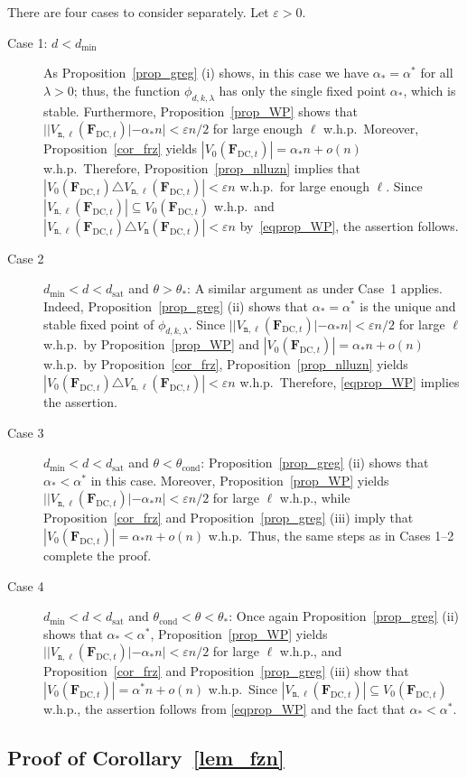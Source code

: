 \documentclass[10pt,reqno]{amsart}
\numberwithin{equation}{section}
\renewcommand{\vec}[1]{\boldsymbol{#1}}
\renewcommand{\subset}{\subseteq}
\newcommand\dmin{d_{\mathrm{min}}}
\newcommand\dsat{d_{\mathrm{sat}}}
\newcommand{\FDC}[1]{\PHI_{\mathrm{DC},{#1}}}
\newcommand{\tcond}{\theta_{\mathrm{cond}}}
\newcommand{\frz}{V_0}
\newcommand{\nll}{\mathtt{n}}
\newcommand\PHI{\vec F}
\newcommand\eps{\varepsilon}
\newcommand{\whp}{w.h.p.}
\newcommand\Prop{Proposition}
\newcommand\Cor{Corollary}
\newcommand{\ph}{\phi_{d,k,\lambda}}
\begin{document}
There are four cases to consider separately.
Let $\eps>0$.
\begin{description}
	\item[Case 1: $d<\dmin$]
		As \Prop~\ref{prop_greg} (i) shows, in this case we have $\alpha_*=\alpha^*$ for all $\lambda>0$; thus, the function $\ph$ has only the single fixed point $\alpha_*$, which is stable.
		Furthermore, \Prop~\ref{prop_WP} shows that $||V_{\nll,\ell}(\FDC t)|-\alpha_*n|<\eps n/2$ for large enough $\ell$ \whp\
		Moreover, \Prop~\ref{cor_frz} yields $|\frz(\FDC t)|=\alpha_*n+o(n)$ \whp\
		Therefore, \Prop~\ref{prop_nlluzn} implies that $|\frz(\FDC t)\triangle V_{\nll,\ell}(\FDC t)|<\eps n$ \whp\ for large enough $\ell$.
		Since $|V_{\nll,\ell}(\FDC t)|\subset\frz(\FDC t)$ \whp\ and $|V_{\nll,\ell}(\FDC t)\triangle V_{\nll}(\FDC t)|<\eps n$ by~\eqref{eqprop_WP}, the assertion follows.
	\item[Case 2] $\dmin<d<\dsat$ and $\theta>\theta_*$: 
		A similar argument as under Case~1 applies.
		Indeed, \Prop~\ref{prop_greg} (ii) shows that $\alpha_*=\alpha^*$ is the unique and stable fixed point of $\ph$.
		Since $||V_{\nll,\ell}(\FDC t)|-\alpha_*n|<\eps n/2$ for large $\ell$ \whp\ by \Prop~\ref{prop_WP} and $|\frz(\FDC t)|=\alpha_*n+o(n)$ \whp\ by \Prop~\ref{cor_frz}, \Prop~\ref{prop_nlluzn} yields $|\frz(\FDC t)\triangle V_{\nll,\ell}(\FDC t)|<\eps n$ \whp\
		Therefore, \eqref{eqprop_WP} implies the assertion.
	\item[Case 3] $\dmin<d<\dsat$ and $\theta<\tcond$:
		\Prop~\ref{prop_greg} (ii) shows that $\alpha_*<\alpha^*$ in this case.
		Moreover, \Prop~\ref{prop_WP} yields $||V_{\nll,\ell}(\FDC t)|-\alpha_*n|<\eps n/2$ for large $\ell$ \whp, while \Prop~\ref{cor_frz} and \Prop~\ref{prop_greg} (iii) imply that $|\frz(\FDC t)|=\alpha_*n+o(n)$ \whp\
		Thus, the same steps as in Cases 1--2 complete the proof.
	\item[Case 4] $\dmin<d<\dsat$ and $\tcond<\theta<\theta_*$:
		Once again \Prop~\ref{prop_greg} (ii) shows that $\alpha_*<\alpha^*$, \Prop~\ref{prop_WP} yields $||V_{\nll,\ell}(\FDC t)|-\alpha_*n|<\eps n/2$ for large $\ell$ \whp, and \Prop~\ref{cor_frz} and \Prop~\ref{prop_greg} (iii) show that $|\frz(\FDC t)|=\alpha^*n+o(n)$ \whp\
		Since $|V_{\nll,\ell}(\FDC t)|\subset\frz(\FDC t)$ \whp, the assertion follows from \eqref{eqprop_WP} and the fact that $\alpha_*<\alpha^*$.
\end{description}

\subsection{Proof of \Cor~\ref{lem_fzn}}\label{sec_lem_fzn}
\end{document}
